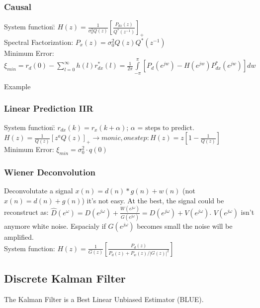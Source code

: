 \subsubsection{Causal }
\begin{tabbing}
System function:\hspace{1.2cm}\=
$H(z)=\frac{1}{\sigma_0^2 Q(z) } [\frac{P_{dx}(z)}{Q^*(z^{-1})} ]_+ $ \\

Spectral Factorization: \>
$ P_x(z) = \sigma_0^2 Q(z) Q^*(z^{-1}) $\\
Minimum Error:\>$\xi_{min} =r_d(0)-\sum \limits_{l=0}^\infty h(l)r_{dx}^{*}(l)
	=\frac{1}{2\pi}\int \limits_{-\pi}^\pi[P_d(e^{jw})-H(e^{jw})P_{dx}^{*}(e^{jw})]dw$\\
\end{tabbing}
Example 

\subsubsection{Linear Prediction IIR }
\begin{tabbing}
System function:\hspace{1.2cm}\=
	$ r_{dx}(k)=r_x(k+\alpha)  \text {;   }\alpha\text { = steps to predict.} $\\
\>	$ H(z)= \frac{1}{Q(z)}[z^a Q(z)]_+ \rightarrow monic, one step: H(z) = z [1- \frac{1}{Q(z)}] $\\
Minimum Error:\>
	$\xi_{min} = \sigma^2_0 \cdot q(0)$\\
\end{tabbing}


\subsubsection{Wiener Deconvolution }
Deconvolutate a signal $x(n)=d(n)\ast g(n) + w(n)$ (not $x(n)=d(n) + g(n)$) it's not easy. At the best, the signal could be reconstruct as:
$\hat{D}(e^{\omega})=D(e^{j\omega}) + \frac{W(e^{j\omega})}{G(e^{j\omega})}=D(e^{j\omega})+V(e^{j\omega})$. $V(e^{j\omega})$ isn't anymore white noise. 
Espacialy if $G(e^{j\omega})$ becomes small the noise will be amplified.\\
System function:\hspace{1.2cm}
	$ H(z)= \frac{1}{G(z)}\left[\frac{P_d(z)}{P_d(z)+P_w(z)/|G(z)|^2}\right]$\\

\subsection{Discrete Kalman Filter }
The Kalman Filter is a Best Linear Unbiased Estimator (BLUE).

